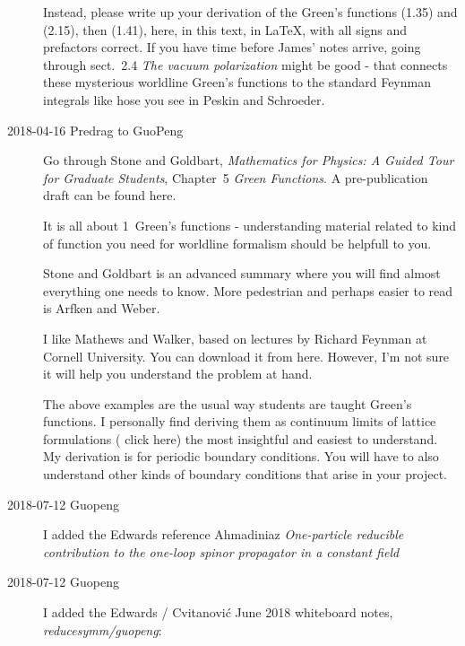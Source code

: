 \begin{description}
Instead, please write up your derivation of the Green’s functions (1.35) and
(2.15), then (1.41), here, in this text, in LaTeX, with all signs and
prefactors correct. If you have time before James' notes arrive, going through
sect.~2.4 {\em The vacuum polarization} might be good - that connects these
mysterious worldline Green's functions to the standard Feynman integrals like
hose you see in Peskin and Schroeder.

\item[2018-04-16 Predrag to GuoPeng]
Go through
Stone and Goldbart, {\em Mathematics for Physics: A Guided Tour
for Graduate Students}, Chapter~5  \emph{Green Functions}.
A pre-publication draft can be found
{here}.

It is all about 1\dmn\ Green's functions - understanding material related to
kind of function you need for worldline formalism should be helpfull to you.

Stone and Goldbart is an advanced summary where you will find
almost everything one needs to know. More pedestrian and perhaps easier to
read is Arfken and Weber.

I like Mathews and Walker, based on lectures by Richard
Feynman at Cornell University. You can download it from
{here}. However, I'm not sure it will help you understand the problem at
hand.

The above examples are the usual way students are taught Green's functions. I
personally find deriving them as continuum limits of lattice formulations
(
{click here}) the most insightful and easiest to understand. My derivation
is for periodic boundary conditions. You will have to also understand other kinds of
boundary conditions that arise in your project.

\item[2018-07-12 Guopeng]
I added the Edwards reference
Ahmadiniaz \etal{}
{\em One-particle reducible contribution to the one-loop spinor propagator in a constant field}

\item[2018-07-12 Guopeng]
I added the Edwards / Cvitanovi\'c June 2018 whiteboard notes, \emph{reducesymm/guopeng}:


\end{description}
